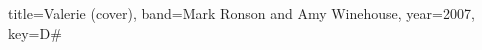 \documentclass{../../tex/bekki-leadsheet}
\begin{document}
\begin{song}{title={Valerie (cover)}, band={Mark Ronson and Amy Winehouse}, year={2007}, key={D#}}

  

\end{song}
\end{document}
